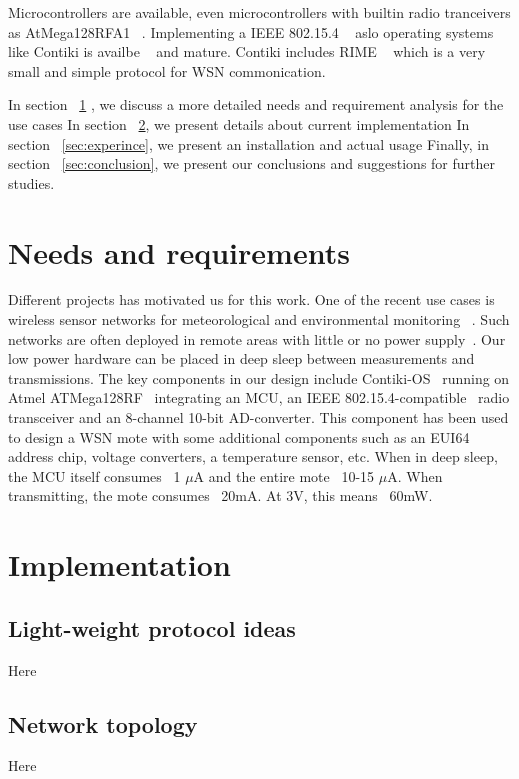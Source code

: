 \documentclass[conference, a4paper,10pt,twocolumn]{IEEEtran}
\begin{document}
Microcontrollers are available, even microcontrollers with builtin radio tranceivers 
as AtMega128RFA1 ~\cite{ATMEGA}. Implementing a IEEE 802.15.4 ~\cite{802154} aslo operating 
systems like Contiki is availbe ~\cite{CONTIKI} and mature. Contiki includes RIME ~\cite{CONTIKI} 
which is a very small and simple protocol for WSN commonication.


In section ~\ref{sec:needs} , we discuss a more detailed needs and requirement analysis for the use cases
In section ~\ref{sec:implementation}, we present details about current implementation  
In section ~\ref{sec:experince}, we present an installation and actual usage
Finally, in section ~\ref{sec:conclusion}, we present our conclusions and suggestions for further studies.

\section{Needs and requirements}
\label{sec:needs}


Different projects has motivated us for this work. One of the recent use cases is wireless sensor 
networks for meteorological and environmental monitoring ~\cite{WIMEA}. 
Such networks are often deployed in remote areas with little or no power supply~\cite{UBIQUI}.  
Our low power hardware can be placed in deep sleep between measurements and transmissions.  The key 
components in our design include  Contiki-OS~\cite{CONTIKI} running on Atmel ATMega128RF~\cite{ATMEGA} 
integrating an MCU, an IEEE 802.15.4-compatible~\cite{802154} radio transceiver and an 8-channel 10-bit 
AD-converter. This component has been used to design a WSN mote with some additional components such 
as an EUI64 address chip, voltage converters, a temperature sensor, etc. When in deep sleep, the MCU 
itself consumes ~1 $\mu$A and the entire mote ~10-15 $\mu$A. When transmitting, the mote consumes 
~20mA. At 3V, this means ~60mW. 


\section{Implementation}
\label{sec:implementation}

\subsection{Light-weight protocol ideas}
Here

\subsection{Network topology}
Here
\end{document}

